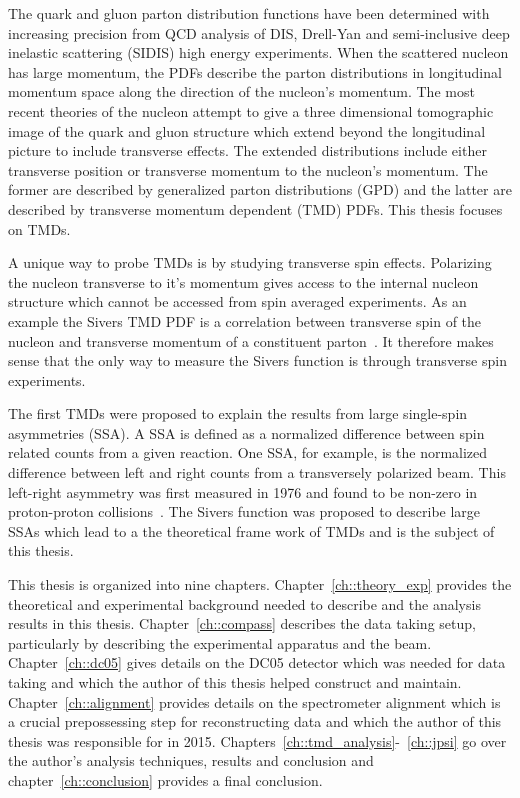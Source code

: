 The quark and gluon parton distribution functions have been determined with
increasing precision from QCD analysis of DIS, Drell-Yan and semi-inclusive deep
inelastic scattering (SIDIS) high energy experiments.  When the scattered
nucleon has large momentum, the PDFs describe the parton distributions
in longitudinal momentum space along the direction of the nucleon's momentum.
The most recent theories of the nucleon attempt to give a three dimensional
tomographic image of the quark and gluon structure which extend beyond the
longitudinal picture to include transverse effects.  The extended distributions
include either transverse position or transverse momentum to the nucleon's
momentum.  The former are described by generalized parton distributions (GPD)
and the latter are described by transverse momentum dependent (TMD) PDFs.  This
thesis focuses on TMDs.

A unique way to probe TMDs is by studying transverse spin effects.  Polarizing
the nucleon transverse to it's momentum gives access to the internal nucleon
structure which cannot be accessed from spin averaged experiments.  As an
example the Sivers TMD PDF is a correlation between transverse spin of the
nucleon and transverse momentum of a constituent parton~\cite{Sivers}.  It
therefore makes sense that the only way to measure the Sivers function is
through transverse spin experiments.

The first TMDs were proposed to explain the results from large single-spin
asymmetries (SSA).  A SSA is defined as a normalized difference between spin
related counts from a given reaction.  One SSA, for example, is the normalized
difference between left and right counts from a transversely polarized beam.
This left-right asymmetry was first measured in 1976 and found to be non-zero in
proton-proton collisions~\cite{PhysRevLett.36.929}.  The Sivers function was
proposed to describe large SSAs which lead to a the theoretical frame work of
TMDs and is the subject of this thesis.

This thesis is organized into nine chapters.  Chapter~\ref{ch::theory_exp}
provides the theoretical and experimental background needed to describe and the
analysis results in this thesis.  Chapter~\ref{ch::compass} describes the data
taking setup, particularly by describing the experimental apparatus and the
beam.  Chapter~\ref{ch::dc05} gives details on the DC05 detector which was
needed for data taking and which the author of this thesis helped construct and
maintain.  Chapter~\ref{ch::alignment} provides details on the spectrometer
alignment which is a crucial prepossessing step for reconstructing data and
which the author of this thesis was responsible for in 2015.
Chapters~\ref{ch::tmd_analysis}-~\ref{ch::jpsi} go over the author's analysis
techniques, results and conclusion and chapter~\ref{ch::conclusion} provides
a final conclusion.
